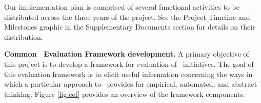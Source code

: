 
Our implementation plan is comprised of several functional activities to be
distributed across the three years of the project. See the Project Timeline
and Milestones graphic in the Supplementary Documents section for details
on their distribution.

{\bf Common \eCT\ Evaluation Framework development.}  A primary objective
of this project is to develop a framework for evaluation of \eCT\
initiatives.  The goal of this evaluation framework is to elicit useful
information concerning the ways in which a particular approach to \eCT\
provides for empirical, automated, and abstract thinking. Figure
\ref{fig:cef} provides an overview of the framework components.

